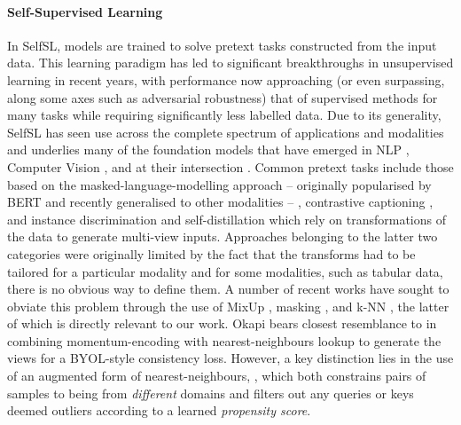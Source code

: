 \paragraph{Self-Supervised Learning} 
%
In \ac{SelfSL}, models are trained to solve pretext tasks constructed from the input data.
%
This learning paradigm has led to significant breakthroughs in unsupervised learning in recent
years, with performance now approaching (or even surpassing, along some axes such as adversarial
robustness) that of supervised methods for many tasks while requiring significantly less labelled data.
%
Due to its generality, \ac{SelfSL} has seen use across the complete spectrum of applications and
modalities and underlies many of the foundation models \citep{bommasani2021opportunities} that have
emerged in NLP \citep{brown2020language, chowdhery2022palm, devlin2018bert}, Computer Vision
\citep{goyal2022vision}, and at their intersection \citep{alayrac2022flamingo, yu2022coca}.
%
Common pretext tasks include those based on the masked-language-modelling approach -- originally
popularised by BERT \citep{devlin2018bert} and recently generalised to other modalities
\citep{baevski2022data2vec, bao2021beit} -- \citep{chen2020simple, he2020momentum}, contrastive
captioning  \citep{radford2021learning, yu2022coca}, and instance discrimination and
self-distillation \citep{caron2021emerging, grill2020bootstrap} which rely on transformations of
the data to generate multi-view inputs.
%
Approaches belonging to the latter two categories were originally limited by the fact that the
transforms had to be tailored for a particular modality and for some modalities, such as tabular
data, there is no obvious way to define them.
%
A number of recent works have sought to obviate this problem through the use of  MixUp
\citep{verma2021towards}, masking \citep{baevski2022data2vec, MaskedAutoencoders2021}, and k-NN
\citep{dwibedi2021little, koohpayegani2021mean, van2021revisiting}, the latter of which is directly
relevant to our work.
%
Okapi bears closest resemblance to \citet{koohpayegani2021mean} in combining momentum-encoding with
nearest-neighbours lookup to generate the views for a BYOL-style \citep{grill2020bootstrap}
consistency loss. 
%
However, a key distinction lies in the use of an augmented form of nearest-neighbours, \CNN, which
both constrains pairs of samples to being from \emph{different} domains and filters out any queries
or keys deemed outliers according to a learned \emph{propensity score}. 

